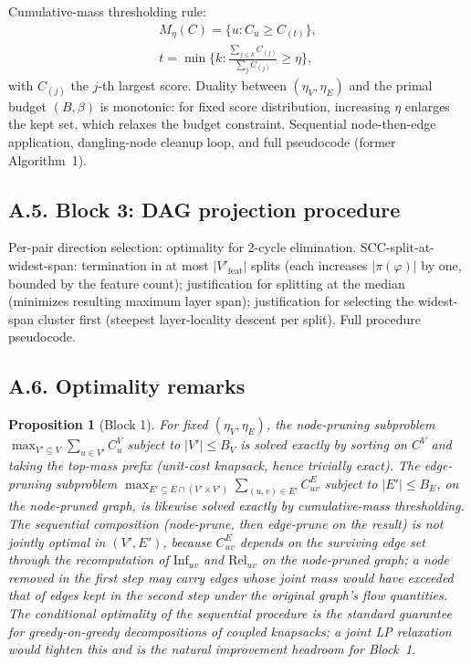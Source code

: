 \documentclass[table, 11pt]{article}
\newtheorem{proposition}{Proposition}
\begin{document}
Cumulative-mass thresholding rule:
\begin{align}
M_\eta(C) = \{u : C_u \ge C_{(t)}\}, \\
t = \min\{k : \tfrac{\sum_{j \le k} C_{(j)}}{\sum_j C_{(j)}} \ge \eta\},
\end{align}
with $C_{(j)}$ the $j$-th largest score. Duality between
$(\eta_V, \eta_E)$ and the primal budget $(B, \beta)$ is monotonic:
for fixed score distribution, increasing $\eta$ enlarges the kept
set, which relaxes the budget constraint. Sequential node-then-edge
application, dangling-node cleanup loop, and full pseudocode (former
Algorithm~1).

\subsection*{A.5. Block 3: DAG projection procedure}\label{app:block3}

Per-pair direction selection: optimality for 2-cycle elimination.
SCC-split-at-widest-span: termination in at most $|V'_{\text{feat}}|$
splits (each increases $|\pi(\varphi)|$ by one, bounded by the
feature count); justification for splitting at the median (minimizes
resulting maximum layer span); justification for selecting the
widest-span cluster first (steepest layer-locality descent per
split). Full procedure pseudocode.

\subsection*{A.6. Optimality remarks}\label{app:optimality}

\begin{proposition}[Block 1]\label{prop:block1}
For fixed $(\eta_V, \eta_E)$, the node-pruning subproblem
$\max_{V' \subseteq V} \sum_{u \in V'} C^V_u$ subject to
$|V'| \le B_V$ is solved exactly by sorting on $C^V$ and taking the
top-mass prefix (unit-cost knapsack, hence trivially exact). The
edge-pruning subproblem
$\max_{E' \subseteq E \cap (V' \times V')} \sum_{(u,v) \in E'} C^E_{uv}$
subject to $|E'| \le B_E$, on the node-pruned graph, is likewise
solved exactly by cumulative-mass thresholding. The sequential
composition (node-prune, then edge-prune on the result) is
\emph{not} jointly optimal in $(V', E')$, because $C^E_{uv}$ depends
on the surviving edge set through the recomputation of
$\text{Inf}_{uv}$ and $\text{Rel}_{uv}$ on the node-pruned graph; a
node removed in the first step may carry edges whose joint mass
would have exceeded that of edges kept in the second step under the
original graph's flow quantities. The conditional optimality of the
sequential procedure is the standard guarantee for greedy-on-greedy
decompositions of coupled knapsacks; a joint LP relaxation would
tighten this and is the natural improvement headroom for Block~1.
\end{proposition}
\end{document}
